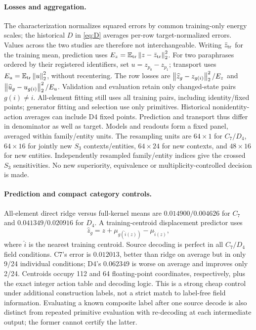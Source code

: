 \paragraph{Losses and aggregation.}
The characterization normalizes squared errors by common training-only energy scales; the historical $D$ in \cref{eq:D} averages per-row target-normalized errors. Values across the two studies are therefore not interchangeable. Writing $\bar z_{\rm tr}$ for the training mean, prediction uses $E_z=\mathbb{E}_{\rm tr}\left\lVert z-\bar z_{\rm tr}\right\rVert_2^2$. For two paraphrases ordered by their registered identifiers, set $u=z_{p_0}-z_{p_1}$; transport uses $E_u=\mathbb{E}_{\rm tr}\left\lVert u\right\rVert_2^2$, without recentering. The row losses are $\left\lVert \widehat z_g-z_{g(i)}\right\rVert_2^2/E_z$ and $\left\lVert \widehat u_g-u_{g(i)}\right\rVert_2^2/E_u$. Validation and evaluation retain only changed-state pairs $g(i)\ne i$. All-element fitting still uses all training pairs, including identity/fixed points; generator fitting and selection use only primitives. Historical nonidentity-action averages can include D4 fixed points. Prediction and transport thus differ in denominator as well as target. Models and readouts form a fixed panel, averaged within family/entity units. The resampling units are $64\times1$ for $C_7/D_4$, $64\times16$ for jointly new $S_3$ contexts/entities, $64\times24$ for new contexts, and $48\times16$ for new entities. Independently resampled family/entity indices give the crossed $S_3$ sensitivities. No new superiority, equivalence or multiplicity-controlled decision is made.


\paragraph{Prediction and compact category controls.}
All-element direct ridge versus full-kernel means are $0.014900/0.004626$ for $C_7$ and $0.041349/0.020916$ for $D_4$. A training-centroid displacement predictor uses
\[
 \widehat z_g=z+\mu_{g(\widehat i(z))}-\mu_{\widehat i(z)},
\]
where $\widehat i$ is the nearest training centroid. Source decoding is perfect in all $C_7/D_4$ field conditions. C7's error is $0.012013$, better than ridge on average but in only 9/24 individual conditions; D4's $0.062349$ is worse on average and improves only 2/24. Centroids occupy 112 and 64 floating-point coordinates, respectively, plus the exact integer action table and decoding logic. This is a strong cheap control under additional construction labels, not a strict match to label-free field information. Evaluating a known composite label after one source decode is also distinct from repeated primitive evaluation with re-decoding at each intermediate output; the former cannot certify the latter.

